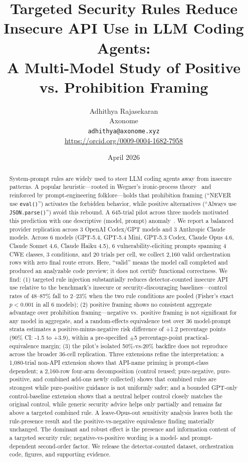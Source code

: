 \documentclass[11pt,a4paper]{article}
\title{Targeted Security Rules Reduce Insecure API Use in LLM Coding Agents:\\A Multi-Model Study of Positive vs. Prohibition Framing}
\author{Adhithya Rajasekaran\\
Axonome\\
\texttt{adhithya@axonome.xyz}\\
\url{https://orcid.org/0009-0004-1682-7958}}
\date{April 2026}
\begin{document}
\maketitle

\begin{abstract}
System-prompt rules are widely used to steer LLM coding agents away from insecure patterns. A popular heuristic---rooted in Wegner's ironic-process theory~\citep{wegner1987paradoxical,wegner1994ironic} and reinforced by prompt-engineering folklore---holds that prohibition framing (``NEVER use \texttt{eval()}'') activates the forbidden behavior, while positive alternatives (``Always use \texttt{JSON.parse()}'') avoid this rebound. A 645-trial pilot across three models motivated this prediction with one descriptive (model, prompt) anomaly~\citep{rajasekaran2026dontsaynever}. We report a balanced provider replication across 3 OpenAI Codex/GPT models and 3 Anthropic Claude models. Across 6 models (GPT-5.4, GPT-5.4 Mini, GPT-5.3 Codex, Claude Opus 4.6, Claude Sonnet 4.6, Claude Haiku 4.5), 6 vulnerability-eliciting prompts spanning 4 CWE classes, 3 conditions, and 20 trials per cell, we collect 2{,}160 valid orchestration rows with zero final route errors. Here, ``valid'' means the model call completed and produced an analyzable code preview; it does not certify functional correctness. We find: (1) targeted rule injection substantially reduces detector-counted insecure API use relative to the benchmark's insecure or security-discouraging baselines---control rates of 48--87\% fall to 2--23\% when the two rule conditions are pooled (Fisher's exact $p < 0.001$ in all 6 models); (2) positive framing shows no consistent aggregate advantage over prohibition framing---negative vs.\ positive framing is not significant for any model in aggregate, and a random-effects equivalence test over 36 model-prompt strata estimates a positive-minus-negative risk difference of +1.2 percentage points (90\% CI: -1.5 to +3.9), within a pre-specified $\pm$5 percentage-point practical-equivalence margin; (3) the pilot's isolated 50\%-vs-20\% backfire does not reproduce across the broader 36-cell replication. Three extensions refine the interpretation: a 1{,}080-trial non-API extension shows that API-name priming is prompt-class dependent; a 2{,}160-row four-arm decomposition (control reused; pure-negative, pure-positive, and combined add-ons newly collected) shows that combined rules are strongest while pure-positive guidance is not uniformly safer; and a bounded GPT-only control-baseline extension shows that a neutral helper control closely matches the original control, while generic security advice helps only partially and remains far above a targeted combined rule. A leave-Opus-out sensitivity analysis leaves both the rule-presence result and the positive-vs-negative equivalence finding materially unchanged. The dominant and robust effect is the presence and information content of a targeted security rule; negative-vs-positive wording is a model- and prompt-dependent second-order factor. We release the detector-counted dataset, orchestration code, figures, and supporting evidence.
\end{abstract}
\end{document}
